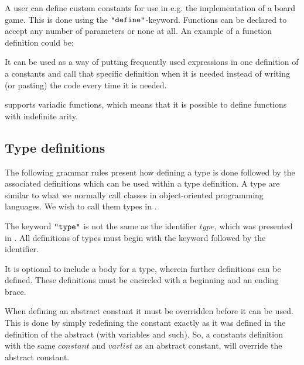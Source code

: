 A user can define custom constants for use in e.g. the implementation of a board game.
This is done using the $\texttt{"define"}$-keyword. Functions can be declared to accept
any number of parameters or none at all. An example of a function definition could
be:


It can be used as a way of putting frequently used expressions in one definition
of a constants and call that specific definition when it is needed instead of
writing (or pasting) the code every time it is needed. 

\productname{} supports variadic functions, which means that it is possible to define
functions with indefinite arity.


\subsection{Type definitions}
\label{sec:typedefinitions}

The following grammar rules present how defining a type is done followed by the
associated definitions which can be used within a type definition. A type are
similar to what we normally call classes in object-oriented programming
languages. We wish to call them types in \productname{}.

\begin{ebnf}
 
\end{ebnf}

The keyword $\texttt{"type"}$ is not the same as the identifier $type$, which was
presented in . All definitions of types must begin with
the keyword followed by the identifier.


It is optional to include a body for a type, wherein further definitions can be
defined. These definitions must be encircled with a beginning and an ending brace. 

When defining an abstract constant it must be overridden before it can be used.
This is done by simply redefining the constant exactly as it was defined in the
definition of the abstract (with variables and such). So, a constants definition
with the same $constant$ and $varlist$ as an abstract constant, will override
the abstract constant.

